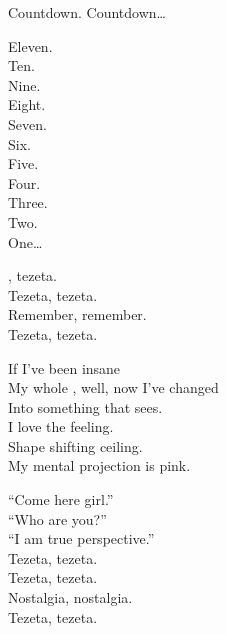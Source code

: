 Countdown. Countdown… \\





Eleven. \\
Ten. \\
Nine. \\
Eight. \\
Seven. \\
Six. \\
Five. \\
Four. \\
Three. \\
Two. \\
One… \\





, tezeta. \\
Tezeta, tezeta. \\
Remember, remember. \\
Tezeta, tezeta. \\


If I've been insane \\
My whole , well, now I've changed \\
Into something that sees. \\
I love the feeling. \\
Shape shifting ceiling. \\
My mental projection is pink. \\


``Come here girl.'' \\
``Who are you?'' \\
``I am true perspective.'' \\

Tezeta, tezeta. \\
Tezeta, tezeta. \\
Nostalgia, nostalgia. \\
Tezeta, tezeta. \\

